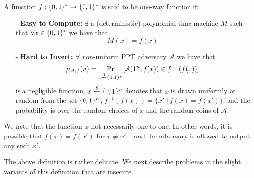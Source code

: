 \begin{definition}
A function $f : \{0,1\}^{*} \rightarrow \{0,1\}^{*}$ is said to be one-way function if:
\begin{itemize}
\item[-] \textbf{Easy to Compute:} $\exists$ a (deterministic) polynomial time machine $M$ such that $\forall x \in \{0,1\}^{*}$ we have that \[M(x) = f(x)\]

\item[-] \textbf{Hard to Invert:} $\forall$ non-uniform PPT adversary $\mathcal{A}$ we have that
    \begin{equation}\label{eq:owf}
    \mu_{\mathcal{A},f}(n) = \Pr_{x \stackrel{\$}{\leftarrow} \{0,1\}^{n}}[ \mathcal{A}(1^n, f(x)) \in f^{-1}(f(x))]
     \end{equation}
     is a negligible function,  $x \overset{\$}{\leftarrow} \{0,1\}^{n}$ denotes that $x$ is drawn uniformly at random from the set $\{0,1\}^{n}$, $f^{-1}(f(x)) = \{x' \mid f(x) = f(x')\}$, and the probability is over the random choices of $x$ and the random coins of $\mathcal{A}$\footnotemark.
\end{itemize}
\end{definition}




We note that the function is not necessarily one-to-one. In other words, it is possible that $f(x) = f(x')$ for $x \neq x'$ -- and the adversary is allowed to output any such $x'$.

The above definition is rather delicate. We next describe problems in the slight variants of this definition that are insecure.

